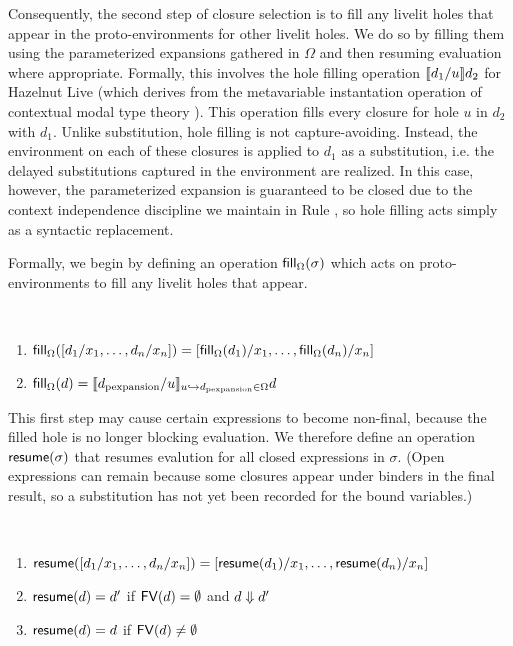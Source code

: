Consequently, the second step of closure selection is to fill any livelit holes that appear in the proto-environments for other livelit holes.
We do so by filling them using the parameterized expansions gathered in $\Omega$ and then resuming
evaluation where appropriate.
Formally, this involves the hole filling operation $\llbracket d_1 / u\rrbracket d_2$ for Hazelnut Live
(which derives from the metavariable instantation operation of contextual modal type theory \cite{HazelnutLive,Nanevski2008}).
This operation
fills every closure for hole $u$ in $d_2$ with $d_1$.
Unlike substitution, hole filling is
not capture-avoiding. Instead, the environment on each of these closures is applied to $d_1$
as a substitution, i.e. the delayed substitutions captured in the environment are realized.
In this case, however, the parameterized expansion is guaranteed to be closed due to
the context independence discipline we maintain in Rule ,
so hole filling acts simply as a syntactic replacement.

Formally, we begin by defining an operation $\mathsf{fill}_{\Omega}(\sigma)$ which acts on proto-environments
to fill any livelit holes that appear.
\begin{definition} ~
    \begin{enumerate}
        \item $\mathsf{fill}_{\Omega}([d_1/x_1, \ldots, d_n/x_n]) = [\mathsf{fill}_{\Omega}(d_1)/x_1, \ldots, \mathsf{fill}_{\Omega}(d_n)/x_n]$
        \item $\mathsf{fill}_{\Omega}(d) = \llbracket d_\text{pexpansion} / u\rrbracket_{u \hookrightarrow d_\text{pexpansion} \in \Omega}{d}$
    \end{enumerate}
\end{definition}

This first step may cause certain expressions to become non-final, because the filled hole is no longer
blocking evaluation. We therefore define an operation $\mathsf{resume}(\sigma)$ that resumes evalution for all closed expressions in $\sigma$.
(Open expressions can remain because some closures appear under binders in the final result, so a substitution has not yet been recorded
for the bound variables.)
\begin{definition} ~
    \begin{enumerate}
        \item $\mathsf{resume}([d_1/x_1, \ldots, d_n/x_n]) = [\mathsf{resume}(d_1)/x_1, \ldots, \mathsf{resume}(d_n)/x_n]$
        \item $\mathsf{resume}(d) = d'$ if $\mathsf{FV}(d) = \emptyset$ and $d \Downarrow d'$
        \item $\mathsf{resume}(d) = d$ if $\mathsf{FV}(d) \neq \emptyset$
    \end{enumerate}
\end{definition}

